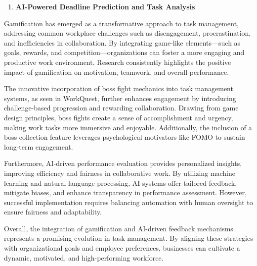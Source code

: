 \begin{enumerate}
    
    
    \item \textbf{AI-Powered Deadline Prediction and Task Analysis}
    
\end{enumerate}  
Gamification has emerged as a transformative approach to task management, addressing common workplace challenges such as disengagement, procrastination, and inefficiencies in collaboration. By integrating game-like elements—such as goals, rewards, and competition—organizations can foster a more engaging and productive work environment. Research consistently highlights the positive impact of gamification on motivation, teamwork, and overall performance.

The innovative incorporation of boss fight mechanics into task management systems, as seen in WorkQuest, further enhances engagement by introducing challenge-based progression and rewarding collaboration. Drawing from game design principles, boss fights create a sense of accomplishment and urgency, making work tasks more immersive and enjoyable. Additionally, the inclusion of a boss collection feature leverages psychological motivators like FOMO to sustain long-term engagement.

Furthermore, AI-driven performance evaluation provides personalized insights, improving efficiency and fairness in collaborative work. By utilizing machine learning and natural language processing, AI systems offer tailored feedback, mitigate biases, and enhance transparency in performance assessment. However, successful implementation requires balancing automation with human oversight to ensure fairness and adaptability.

Overall, the integration of gamification and AI-driven feedback mechanisms represents a promising evolution in task management. By aligning these strategies with organizational goals and employee preferences, businesses can cultivate a dynamic, motivated, and high-performing workforce.
